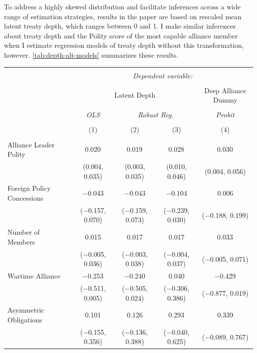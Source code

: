 \documentclass[12pt]{article}
\begin{document}
To address a highly skewed distribution and facilitate inferences across a wide range of estimation strategies, results in the paper are based on rescaled mean latent treaty depth, which ranges between 0 and 1. 
I make similar inferences about treaty depth and the Polity score of the most capable alliance member when I estimate regression models of treaty depth without this transformation, however. 
\autoref{tab:depth-alt-models} summarizes these results. 

\begin{table}[!htbp] 
\centering 
\begin{adjustbox}{width= .95\textwidth, center}
\begin{tabular}{@{\extracolsep{5pt}}lcccc} 
\\[-1.8ex]\hline 
\hline \\[-1.8ex] 
 & \multicolumn{4}{c}{\textit{Dependent variable:}} \\ 
\cline{2-5} 
\\[-1.8ex] & \multicolumn{3}{c}{Latent Depth} & Deep Alliance Dummy \\ 
\\[-1.8ex] & \textit{OLS} & \multicolumn{2}{c}{\textit{Robust Reg.}} & \textit{Probit} \\ 
\\[-1.8ex] & (1) & (2) & (3) & (4)\\ 
\hline \\[-1.8ex] 
 Alliance Leader Polity & 0.020$^{}$ & 0.019$^{}$ & 0.028$^{}$ & 0.030$^{}$ \\ 
  & (0.004, 0.035) & (0.003, 0.035) & (0.010, 0.046) & (0.004, 0.056) \\ 
  Foreign Policy Concessions & $-$0.043 & $-$0.043 & $-$0.104 & 0.006 \\ 
  & ($-$0.157, 0.070) & ($-$0.159, 0.073) & ($-$0.239, 0.030) & ($-$0.188, 0.199) \\ 
  Number of Members & 0.015 & 0.017 & 0.017 & 0.033$^{}$ \\ 
  & ($-$0.005, 0.036) & ($-$0.003, 0.038) & ($-$0.004, 0.037) & ($-$0.005, 0.071) \\ 
  Wartime Alliance & $-$0.253$^{}$ & $-$0.240$^{}$ & 0.040 & $-$0.429$^{}$ \\ 
  & ($-$0.511, 0.005) & ($-$0.505, 0.024) & ($-$0.306, 0.386) & ($-$0.877, 0.019) \\ 
  Asymmetric Obligations & 0.101 & 0.126 & 0.293$^{}$ & 0.339 \\ 
  & ($-$0.155, 0.356) & ($-$0.136, 0.388) & ($-$0.040, 0.625) & ($-$0.089, 0.767) \\ 

\end{tabular}
\end{adjustbox}
\end{table}
\end{document}
